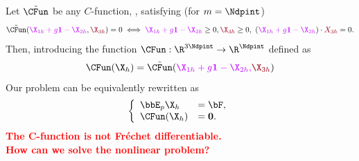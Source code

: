 \documentclass[aspectratio=169]{beamer}
\begin{document}
\begin{frame}
Let
$\tilde \CFun$ be any $C$-function, \ie, satisfying (for $m=\Ndpint$)
\begin{equation*}
\tilde \CFun(\textcolor{electricpurple}{\X_{1h} + g {\bf 1} - \X_{2h}}, \textcolor{carmine}{\X_{3h}})= 0 \iff \textcolor{electricpurple}{\X_{1h} + g {\bf 1} - \X_{2h}} \geq 0, \textcolor{carmine}{\X_{3h}} \geq 0, \  \left(\textcolor{electricpurple}{\X_{1h} + g {\bf 1} - \X_{2h}}\right) \cdot \textcolor{carmine}{X_{3h}} = 0.
\end{equation*} 
Then, introducing the function $\CFun:\R^{3 \Ndpint} \rightarrow \R^{\Ndpint}$ defined as
\begin{equation*}
\CFun(\X_{h})
= \tilde \CFun(\textcolor{electricpurple}{\X_{1h} + g {\bf 1} - \X_{2h},} \textcolor{carmine}{\X_{3h}})
\end{equation*}
Our problem
can be equivalently rewritten as
\begin{equation*}
\left\lbrace\begin{array}{llccc}
\bbE_{p} \X_{h} &= \bF,\\
\CFun(\X_{h})&=\mathbf{0}.
\end{array}
\right.
\end{equation*}
\textcolor{red}{\textbf{The C-function is not Fréchet differentiable.}}\\
\vspace{0.2 cm}
\textcolor{red}{\textbf{How can we solve the nonlinear problem?}}
\end{frame}
%
\end{document}
